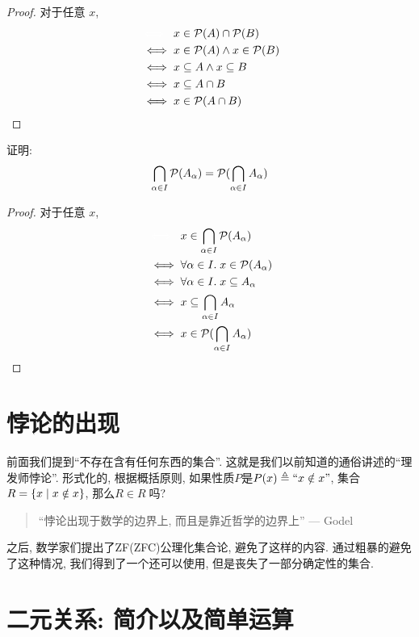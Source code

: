 \begin{proof}
  对于任意 $x$,
  \begin{align*}
    &\textcolor{white}{\iff}\;\; x \in \ps{A} \cap \ps{B} \\
    &\iff x \in \ps{A} \land x \in \ps{B} \\
    &\iff x \subseteq A \land x \subseteq B \\
    &\iff x \subseteq A \cap B \\
    &\iff x \in \ps{A \cap B}
  \end{align*}
\end{proof}

\begin{theorem}
  证明: 
  \[
    \bigcap_{\alpha \in I} \mathcal{P}(A_{\alpha}) = \mathcal{P}(\bigcap_{\alpha \in I} A_{\alpha})
  \]
\end{theorem}

\begin{proof}
  对于任意 $x$,
  \begin{align*}
    &\textcolor{white}{\iff}\;\; x \in \bigcap_{\alpha \in I} \ps{A_{\alpha}} \\
    &\iff \forall \alpha \in I.\; x \in \ps{A_{\alpha}} \\
    &\iff \forall \alpha \in I.\; x \subseteq A_{\alpha} \\
    &\iff x \subseteq \bigcap_{\alpha \in I} A_{\alpha} \\
    &\iff x \in \ps{\bigcap_{\alpha \in I} A_{\alpha}}
  \end{align*}
\end{proof}

\section{悖论的出现}

前面我们提到``不存在含有任何东西的集合''. 这就是我们以前知道的通俗讲述的``理发师悖论''. 形式化的, 根据概括原则, 如果性质$P$是$P(x) \triangleq ``x \notin x"$, 集合$R = \{x \mid x \notin x\}$, 那么$R \in R\;$吗? 

\begin{quote}
  ``悖论出现于数学的边界上, 而且是靠近哲学的边界上''
  \hfill --- Godel
\end{quote}

之后, 数学家们提出了ZF(ZFC)公理化集合论, 避免了这样的内容. 通过粗暴的避免了这种情况, 我们得到了一个还可以使用, 但是丧失了一部分确定性的集合. 


\section{二元关系: 简介以及简单运算}


